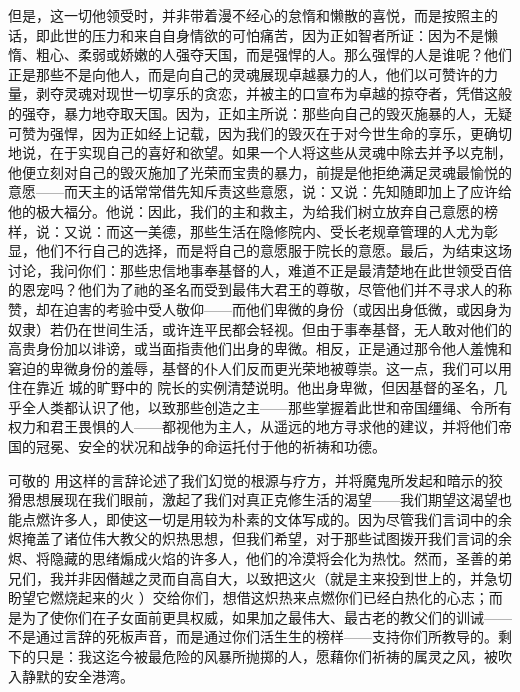 但是，这一切他领受时，并非带着漫不经心的怠惰和懒散的喜悦，而是按照主的话，即此世的压力和来自自身情欲的可怕痛苦，因为正如智者所证：因为不是懒惰、粗心、柔弱或娇嫩的人强夺天国，而是强悍的人。那么强悍的人是谁呢？他们正是那些不是向他人，而是向自己的灵魂展现卓越暴力的人，他们以可赞许的力量，剥夺灵魂对现世一切享乐的贪恋，并被主的口宣布为卓越的掠夺者，凭借这般的强夺，暴力地夺取天国。因为，正如主所说：那些向自己的毁灭施暴的人，无疑可赞为强悍，因为正如经上记载，因为我们的毁灭在于对今世生命的享乐，更确切地说，在于实现自己的喜好和欲望。如果一个人将这些从灵魂中除去并予以克制，他便立刻对自己的毁灭施加了光荣而宝贵的暴力，前提是他拒绝满足灵魂最愉悦的意愿——而天主的话常常借先知斥责这些意愿，说：又说：先知随即加上了应许给他的极大福分。他说：因此，我们的主和救主，为给我们树立放弃自己意愿的榜样，说：又说：而这一美德，那些生活在隐修院内、受长老规章管理的人尤为彰显，他们不行自己的选择，而是将自己的意愿服于院长的意愿。最后，为结束这场讨论，我问你们：那些忠信地事奉基督的人，难道不正是最清楚地在此世领受百倍的恩宠吗？他们为了祂的圣名而受到最伟大君王的尊敬，尽管他们并不寻求人的称赞，却在迫害的考验中受人敬仰——而他们卑微的身份（或因出身低微，或因身为奴隶）若仍在世间生活，或许连平民都会轻视。但由于事奉基督，无人敢对他们的高贵身份加以诽谤，或当面指责他们出身的卑微。相反，正是通过那令他人羞愧和窘迫的卑微身份的羞辱，基督的仆人们反而更光荣地被尊崇。这一点，我们可以用住在靠近 城的旷野中的 院长的实例清楚说明。他出身卑微，但因基督的圣名，几乎全人类都认识了他，以致那些创造之主——那些掌握着此世和帝国缰绳、令所有权力和君王畏惧的人——都视他为主人，从遥远的地方寻求他的建议，并将他们帝国的冠冕、安全的状况和战争的命运托付于他的祈祷和功德。\par

可敬的 用这样的言辞论述了我们幻觉的根源与疗方，并将魔鬼所发起和暗示的狡猾思想展现在我们眼前，激起了我们对真正克修生活的渴望——我们期望这渴望也能点燃许多人，即使这一切是用较为朴素的文体写成的。因为尽管我们言词中的余烬掩盖了诸位伟大教父的炽热思想，但我们希望，对于那些试图拨开我们言词的余烬、将隐藏的思绪煽成火焰的许多人，他们的冷漠将会化为热忱。然而，圣善的弟兄们，我并非因僭越之灵而自高自大，以致把这火（就是主来投到世上的，并急切盼望它燃烧起来的火 ）交给你们，想借这炽热来点燃你们已经白热化的心志；而是为了使你们在子女面前更具权威，如果加之最伟大、最古老的教父们的训诫——不是通过言辞的死板声音，而是通过你们活生生的榜样——支持你们所教导的。剩下的只是：我这迄今被最危险的风暴所抛掷的人，愿藉你们祈祷的属灵之风，被吹入静默的安全港湾。\par

